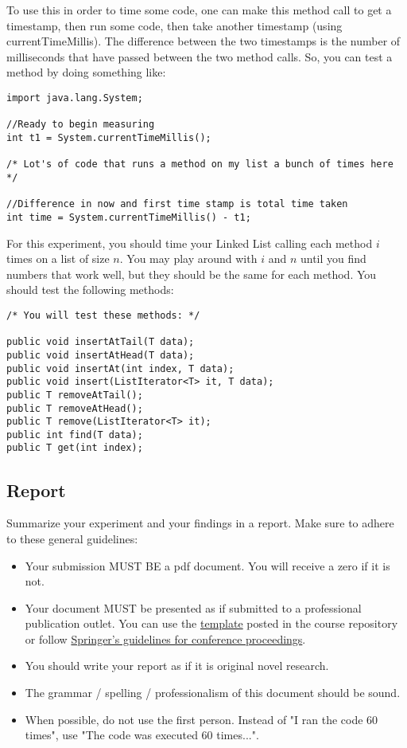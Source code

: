 \documentclass[paper=a4, fontsize=11pt, parskip=full]{scrartcl} %
\numberwithin{equation}{section} %
\numberwithin{figure}{section} %
\numberwithin{table}{section} %
\begin{document}
To use this in order to time some code, one can make this method call to get a timestamp, then run some code, then take another timestamp (using currentTimeMillis). The difference between the two timestamps is the number of milliseconds that have passed between the two method calls. So, you can test a method by doing something like:

\begin{lstlisting}
import java.lang.System;

//Ready to begin measuring
int t1 = System.currentTimeMillis();

/* Lot's of code that runs a method on my list a bunch of times here */

//Difference in now and first time stamp is total time taken
int time = System.currentTimeMillis() - t1;
\end{lstlisting}

For this experiment, you should time your Linked List calling each method $i$ times on a list of size $n$. You may play around with $i$ and $n$ until you find numbers that work well, but they should be the same for each method. You should test the following methods:

\begin{lstlisting}
/* You will test these methods: */

public void insertAtTail(T data);
public void insertAtHead(T data);
public void insertAt(int index, T data);
public void insert(ListIterator<T> it, T data);
public T removeAtTail();
public T removeAtHead();
public T remove(ListIterator<T> it);
public int find(T data);
public T get(int index);
\end{lstlisting}

\subsection{Report}

Summarize your experiment and your findings in a report. Make sure to adhere to these general guidelines:

\begin{itemize}
	\item Your submission MUST BE a pdf document. You will receive a zero if it is not.
	\item Your document MUST be presented as if submitted to a professional publication outlet. You can use the \href{https://github.com/markfloryan/dsa1/blob/master/labs/WordPaperTemplate.zip}{template} posted in the course repository or follow \href{https://www.springer.com/us/computer-science/lncs/conference-proceedings-guidelines}{Springer's guidelines for conference proceedings}.
	\item You should write your report as if it is original novel research.
	\item The grammar / spelling / professionalism of this document should be sound.
	\item When possible, do not use the first person. Instead of "I ran the code 60 times", use "The code was executed 60 times...".
\end{itemize}
\end{document}
